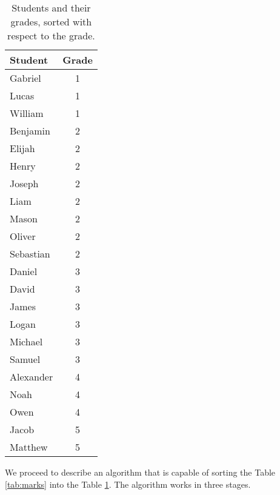 \begin{table}[!ht]
  \centering
  \begin{tabular}{|l|c|}
    \hline
    Student   & Grade \\
    \hline
    \hline
    Gabriel   & 1 \\
    \hline
    Lucas     & 1 \\
    \hline
    William   & 1 \\
    \hline
    Benjamin  & 2 \\
    \hline
    Elijah    & 2 \\
    \hline
    Henry     & 2 \\
    \hline
    Joseph    & 2 \\
    \hline
    Liam      & 2 \\
    \hline
    Mason     & 2 \\
    \hline
    Oliver    & 2 \\
    \hline
    Sebastian & 2 \\
    \hline
    Daniel    & 3 \\
    \hline
    David     & 3 \\
    \hline
    James     & 3 \\
    \hline
    Logan     & 3 \\
    \hline
    Michael   & 3 \\
    \hline
    Samuel    & 3 \\
    \hline
    Alexander & 4 \\
    \hline
    Noah      & 4 \\
    \hline
    Owen      & 4 \\
    \hline
    Jacob     & 5 \\
    \hline
    Matthew   & 5 \\
    \hline
  \end{tabular}
  \caption{Students and their grades, sorted with respect to the grade.}
  \label{tab:marks-sorted}
\end{table}
We proceed to describe an algorithm that is capable of sorting the Table \ref{tab:marks} into the Table
\ref{tab:marks-sorted}.  The algorithm works in three stages.
